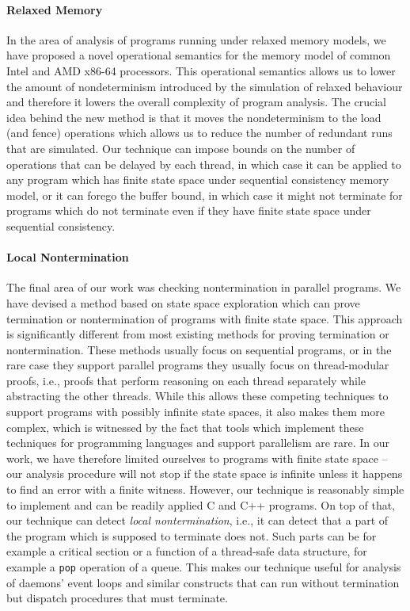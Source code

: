 \paragraph{Relaxed Memory}

In the area of analysis of programs running under relaxed memory models, we have proposed a novel operational semantics for the \xtso memory model of common Intel and AMD x86-64 processors.
This operational semantics allows us to lower the amount of nondeterminism introduced by the simulation of relaxed behaviour and therefore it lowers the overall complexity of program analysis.
The crucial idea behind the new method is that it moves the nondeterminism to the load (and fence) operations which allows us to reduce the number of redundant runs that are simulated.
Our technique can impose bounds on the number of operations that can be delayed by each thread, in which case it can be applied to any program which has finite state space under sequential consistency memory model, or it can forego the buffer bound, in which case it might not terminate for programs which do not terminate even if they have finite state space under sequential consistency.

\paragraph{Local Nontermination}

The final area of our work was checking nontermination in parallel programs.
We have devised a method based on state space exploration which can prove termination or nontermination of programs with finite state space.
This approach is significantly different from most existing methods for proving termination or nontermination.
These methods usually focus on sequential programs, or in the rare case they support parallel programs they usually focus on thread-modular proofs, i.e., proofs that perform reasoning on each thread separately while abstracting the other threads.
While this allows these competing techniques to support programs with possibly infinite state spaces, it also makes them more complex, which is witnessed by the fact that tools which implement these techniques for programming languages and support parallelism are rare.
In our work, we have therefore limited ourselves to programs with finite state space -- our analysis procedure will not stop if the state space is infinite unless it happens to find an error with a finite witness.
However, our technique is reasonably simple to implement and can be readily applied C and C++ programs.
On top of that, our technique can detect \emph{local nontermination}, i.e., it can detect that a part of the program which is supposed to terminate does not.
Such parts can be for example a critical section or a function of a thread-safe data structure, for example a \texttt{pop} operation of a queue.
This makes our technique useful for analysis of daemons' event loops and similar constructs that can run without termination but dispatch procedures that must terminate.

